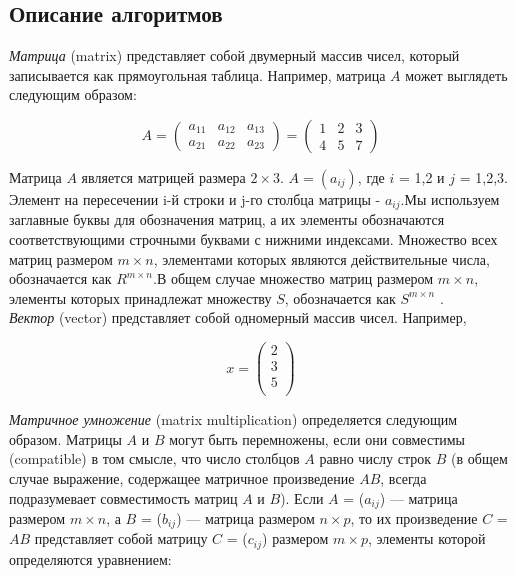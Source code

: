\documentclass[a4paper,12pt]{article}
\begin{document}
\subsection{Описание алгоритмов}
\textit{Матрица} (matrix) представляет собой двумерный массив чисел, который записывается как прямоугольная таблица\cite{Kormen}.
Например, матрица $A$ может выглядеть следующим образом:
\begin{center}
\begin{equation}
A = \left(
\begin{array}{lll}
a_{11} & a_{12} & a_{13} \\
a_{21} & a_{22} & a_{23}
\end{array}
\right) = \left(
\begin{array}{lll}
1 & 2 & 3 \\
4 & 5 & 7
\end{array}
\right)
\end{equation}
\end{center}
Матрица $A$ является матрицей размера $2 × 3$. $A = (a_{ij})$, где $i$ = 1,2 и $j$ = 1,2,3. Элемент на пересечении i-й строки и j-го столбца матрицы - $a_{ij}$.Мы используем заглавные буквы для обозначения матриц, а их элементы обозначаются соответствующими строчными буквами с нижними индексами. Множество всех матриц размером $m×n$, элементами которых являются действительные числа, обозначается как $R^{m×n}$.В общем случае множество матриц размером $m × n$, элементы которых принадлежат множеству $S$, обозначается как $S^{m×n}$ .\\
\textit{Вектор} (vector) представляет собой одномерный массив чисел. Например,
\begin{center}
\begin{equation}
x = \left(
\begin{matrix}
2 \\
3 \\
5 \\
\end{matrix}
\right)
\end{equation}
\end{center}
\textit{Матричное умножение} (matrix multiplication) определяется следующим образом. Матрицы $A$ и $B$ могут быть перемножены, если они совместимы (compatible) в том смысле, что число столбцов $A$ равно числу строк $B$ (в общем случае выражение, содержащее матричное произведение $AB$, всегда подразумевает совместимость матриц $A$ и $B$). Если $A$ = ($a_{ij}$) — матрица размером $m × n$, а $B$ = ($b_{ij}$) — матрица размером $n × p$, то их произведение $C$ = $AB$ представляет собой матрицу $C$ = ($c_{ij}$) размером $m × p$, элементы которой определяются уравнением:
\end{document}
